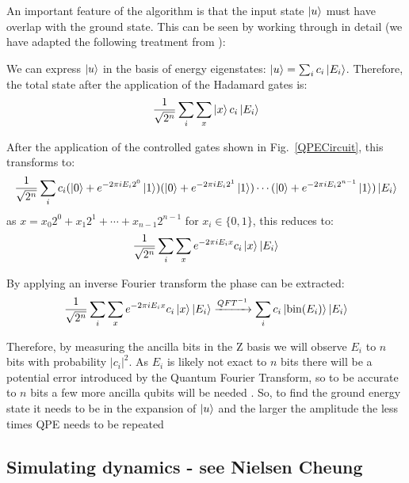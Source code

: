 \documentclass[twoside]{article}
\begin{document}
An important feature of the algorithm is that the input state $\ket{u}$ must have overlap with the ground state. This can be seen by working through in detail (we have adapted the following treatment from \cite{chemistryReview}):\\
\begin{itemlist}
\item We can express $\ket{u}$ in the basis of energy eigenstates: $\ket{u} = \sum_i c_i \ket{E_i}$. Therefore, the total state after the application of the Hadamard gates is: 
        \begin{equation}
                \frac{1}{\sqrt{2^n}} \sum_i \sum_x \ket{x} c_i \ket{E_i}
        \end{equation}
\item After the application of the controlled gates shown in Fig.~\ref{QPECircuit}, this transforms to:
        \begin{equation}
        \frac{1}{\sqrt{2^n}} \sum_i c_i (\ket{0} + e^{-2\pi i  E_i 2^0}\ket{1})(\ket{0} + e^{-2\pi i E_i 2^1} \ket{1}) \cdots (\ket{0} + e^{-2\pi i  E_i 2^{n-1}}\ket{1}) \ket{E_i} \end{equation}
        as $x = x_0 2^0 + x_1 2^1 + \cdots + x_{n-1} 2^{n-1}$ for $x_i \in \{0,1\}$, this reduces to:
        \begin{equation}
                \frac{1}{\sqrt{2^n}} \sum_i \sum_x e^{-2\pi i E_i x}c_i \ket{x}  \ket{E_i}
        \end{equation}
\item By applying an inverse Fourier transform the phase can be extracted:
        \begin{equation}
                \frac{1}{\sqrt{2^n}} \sum_i \sum_x e^{-2\pi i E_i x}c_i \ket{x}  \ket{E_i} \xrightarrow{QFT^{-1}} \sum_i c_i \ket{\text{bin}(E_i)} \ket{E_i}
        \end{equation}
\item Therefore, by measuring the ancilla bits in the Z basis we will observe $E_i$ to $n$ bits with probability $|c_i|^2$. As $E_i$ is likely not exact to $n$ bits there will be a potential error introduced by the Quantum Fourier Transform, so to be accurate to $n$ bits a few more ancilla qubits will be needed \cite{nielsenChuang}. So, to find the ground energy state it needs to be in the expansion of $\ket{u}$ and the larger the amplitude the less times QPE needs to be repeated
\end{itemlist}
\subsection{Simulating dynamics - see Nielsen Cheung}
\end{document}
